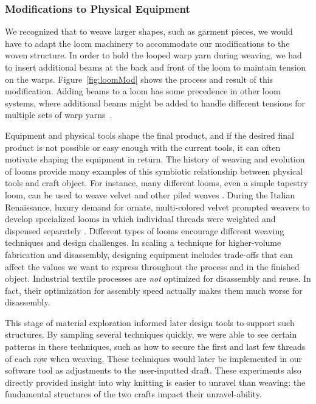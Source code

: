 \documentclass{sigchi}
\begin{document}
\subsubsection{Modifications to Physical Equipment}

We recognized that to weave larger shapes, such as garment pieces, we would have to adapt the loom machinery to accommodate our modifications to the woven structure. In order to hold the looped warp yarn during weaving, we had to insert additional beams at the back and front of the loom to maintain tension on the warps. Figure~\ref{fig:loomMod} shows the process and result of this modification. Adding beams to a loom has some precedence in other loom systems, where additional beams might be added to handle different tensions for multiple sets of warp yarns~\cite{essen_easysupp_2016}.

Equipment and physical tools shape the final product, and if the desired final product is not possible or easy enough with the current tools, it can often motivate shaping the equipment in return. The history of weaving and evolution of looms provide many examples of this symbiotic relationship between physical tools and craft object. For instance, many different looms, even a simple tapestry loom, can be used to weave velvet and other piled weaves \cite{essen_easysupp_2016}. During the Italian Renaissance, luxury demand for ornate, multi-colored velvet prompted weavers to develop specialized looms in which individual threads were weighted and dispensed separately \cite{watt_renaissance_velvet}.
Different types of looms encourage different weaving techniques and design challenges. In scaling a technique for higher-volume fabrication and disassembly, designing equipment includes trade-offs that can affect the values we want to express throughout the process and in the finished object. Industrial textile processes are \emph{not} optimized for disassembly and reuse. In fact, their optimization for assembly speed actually makes them much worse for disassembly.

This stage of material exploration informed later design tools to support such structures. By sampling several techniques quickly, we were able to see certain patterns in these techniques, such as how to secure the first and last few threads of each row when weaving. These techniques would later be implemented in our software tool as adjustments to the user-inputted draft. These experiments also directly provided insight into why knitting is easier to unravel than weaving: the fundamental structures of the two crafts impact their unravel-ability. 
\end{document}
